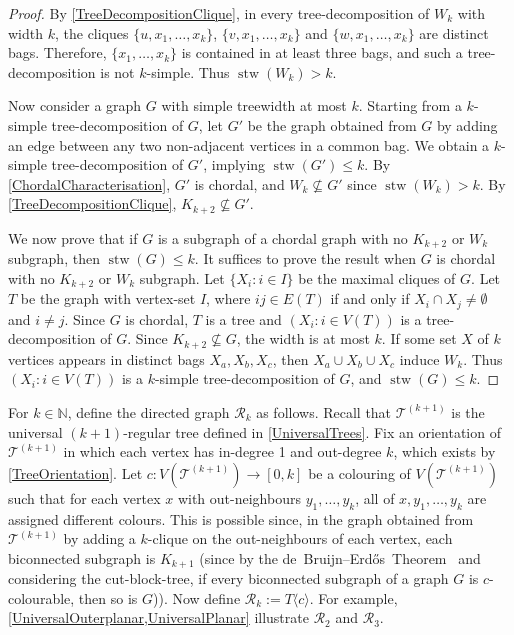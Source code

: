\documentclass[a4paper,11pt]{article}
\theoremstyle{plain}
\theoremstyle{definition}
\renewcommand{\leq}{\leqslant}
\DeclareMathOperator{\stw}{stw}
\newcommand{\TT}{\mathcal{T}}
\newcommand{\RR}{\mathcal{R}}
\newcommand{\NN}{\mathbb{N}}
\newcommand{\GGG}[2]{#1\langle{#2}\rangle}
\begin{document}
\begin{proof}
By \cref{TreeDecompositionClique}, in every tree-decomposition of $W_k$ with width $k$, the cliques $\{u,x_1,\dots,x_k\}$, $\{v,x_1,\dots,x_k\}$ and $\{w,x_1,\dots,x_k\}$ are distinct bags. Therefore, $\{x_1, \dots, x_k\}$ is contained in at least three bags, and such a tree-decomposition is not $k$-simple. Thus $\stw(W_k)>k$.

Now consider a graph $G$ with  simple treewidth at most $k$. Starting from a $k$-simple tree-decomposition of $G$, let $G'$ be the graph obtained from $G$ by adding an edge between any two non-adjacent vertices in a common bag. We obtain a $k$-simple tree-decomposition of $G'$, implying $\stw(G')\leq k$. By \cref{ChordalCharacterisation}, $G'$ is chordal, and $W_k\not\subseteq G'$ since $\stw(W_k)>k$. By \cref{TreeDecompositionClique}, $K_{k+2}\not\subseteq G'$. 

We now prove that if $G$ is a subgraph of a chordal graph with no $K_{k+2}$ or $W_k$ subgraph, then $\stw(G)\leq k$. It suffices to prove the result when $G$ is chordal with no $K_{k+2}$ or $W_k$ subgraph. Let $\{X_i:i\in I\}$ be the maximal cliques of $G$. Let $T$ be the graph with vertex-set $I$, where $ij\in E(T)$ if and only if $X_i\cap X_j\neq\emptyset$ and $i\neq j$. Since $G$ is chordal, $T$ is a tree and $(X_i:i\in V(T))$ is a tree-decomposition of $G$. Since $K_{k+2}\not\subseteq G$, the width is at most $k$. If some set $X$ of $k$ vertices appears in distinct bags $X_a,X_b,X_c$, then $X_a\cup X_b\cup X_c$ induce $W_k$. Thus 
$(X_i:i\in V(T))$ is a $k$-simple tree-decomposition of $G$, and $\stw(G)\leq k$. 
\end{proof}

For $k\in\NN$, define the directed graph $\RR_k$ as follows. 
Recall that $\TT^{(k+1)}$ is the universal $(k+1)$-regular tree defined in \cref{UniversalTrees}. Fix an orientation of $\TT^{(k+1)}$ in which each vertex has in-degree 1 and out-degree $k$, which exists by \cref{TreeOrientation}. Let $c:V(\TT^{(k+1)})\to[0,k]$ be a colouring of $V(\TT^{(k+1)})$ such that for each vertex $x$ with out-neighbours $y_1,\dots,y_k$, all of $x,y_1,\dots,y_k$ are assigned different colours. This is possible since, in the graph obtained from $\TT^{(k+1)}$ by adding a $k$-clique on the out-neighbours of each vertex, each biconnected subgraph is $K_{k+1}$ (since by the de~Bruijn--Erd\H{o}s~Theorem~\citep{dBE51} and considering the cut-block-tree, if every biconnected subgraph of a graph $G$ is $c$-colourable, then so is $G$)). Now define $\RR_k:=\GGG{T}{c}$. For example, \cref{UniversalOuterplanar,UniversalPlanar} illustrate $\RR_2$ and $\RR_3$. 
\end{document}
